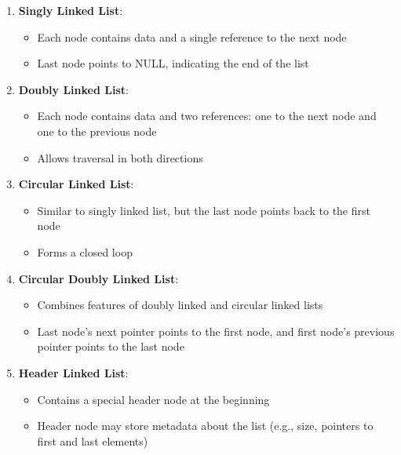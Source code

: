 \documentclass[]{article}
\providecommand{\tightlist}{%
  \setlength{\itemsep}{0pt}\setlength{\parskip}{0pt}}
\begin{document}
\begin{enumerate}
\def\labelenumi{\arabic{enumi}.}
\tightlist
\item
  \textbf{Singly Linked List}:

  \begin{itemize}
  \tightlist
  \item
    Each node contains data and a single reference to the next node
  \item
    Last node points to NULL, indicating the end of the list
  \end{itemize}
\item
  \textbf{Doubly Linked List}:

  \begin{itemize}
  \tightlist
  \item
    Each node contains data and two references: one to the next node and
    one to the previous node
  \item
    Allows traversal in both directions
  \end{itemize}
\item
  \textbf{Circular Linked List}:

  \begin{itemize}
  \tightlist
  \item
    Similar to singly linked list, but the last node points back to the
    first node
  \item
    Forms a closed loop
  \end{itemize}
\item
  \textbf{Circular Doubly Linked List}:

  \begin{itemize}
  \tightlist
  \item
    Combines features of doubly linked and circular linked lists
  \item
    Last node\textgujarati{’}s next pointer points to the first node,
    and first node\textgujarati{’}s previous pointer points to the last
    node
  \end{itemize}
\item
  \textbf{Header Linked List}:

  \begin{itemize}
  \tightlist
  \item
    Contains a special header node at the beginning
  \item
    Header node may store metadata about the list (e.g., size, pointers
    to first and last elements)
  \end{itemize}
\end{enumerate}
\end{document}
